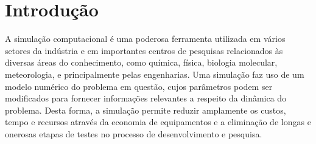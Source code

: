 \pagestyle{fancy}




\chapter{Introdução}\label{intro}


A simulação computacional é uma poderosa ferramenta utilizada em vários setores da indústria e em
importantes centros de pesquisas relacionados às diversas áreas do conhecimento, como química,
física, biologia molecular, meteorologia, e principalmente pelas engenharias. Uma simulação faz uso
de um modelo numérico do problema em questão, cujos parâmetros podem ser modificados para fornecer
informações relevantes a respeito da dinâmica do problema. Desta forma, a simulação permite reduzir
amplamente os custos, tempo e recursos através da economia de equipamentos e a eliminação de longas
e onerosas etapas de testes no processo de desenvolvimento e pesquisa.
